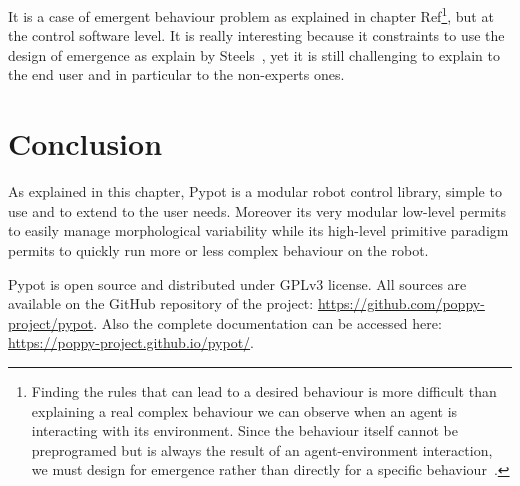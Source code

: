 It is a case of emergent behaviour problem as explained in chapter Ref\footnote{Finding the rules that can lead to a desired behaviour is more difficult than explaining a real complex behaviour we can observe when an agent is interacting with its environment. Since the behaviour itself cannot be preprogramed but is always the result of an agent-environment interaction, we must design for emergence rather than directly for a specific behaviour~\parencite{Pfeifer06}.}, but at the control software level. It is really interesting because it constraints to use the design of emergence as explain by Steels~\parencite{Steels1991emergence}, yet it is still challenging to explain to the end user and in particular to the non-experts ones.


\section{Conclusion} %

As explained in this chapter, Pypot is a modular robot control library, simple to use and to extend to the user needs. Moreover its very modular low-level permits to easily manage morphological variability while its high-level primitive paradigm permits to quickly run more or less complex behaviour on the robot.

Pypot is open source and distributed under GPLv3 license. All sources are available on the GitHub repository of the project: \url{https://github.com/poppy-project/pypot}. Also the complete documentation can be accessed here: \url{https://poppy-project.github.io/pypot/}.





% 


